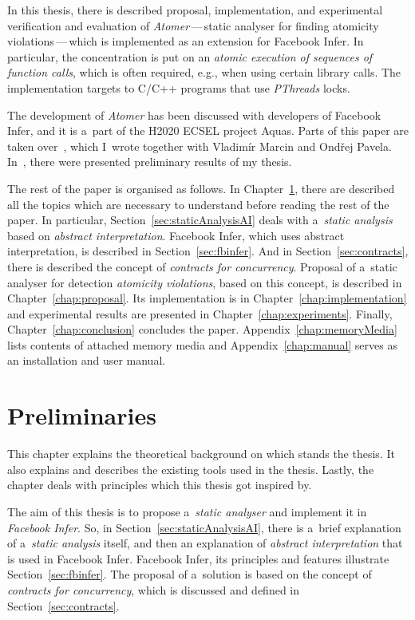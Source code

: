In this thesis, there is described proposal, implementation, and experimental
verification and evaluation of \emph{Atomer}\,---\,static analyser for
finding atomicity violations\,---\,which is implemented as an extension for
Facebook Infer. In particular, the concentration is put on an
\emph{atomic execution of sequences of function calls}, which is often
required, e.g., when using certain library calls. The implementation targets
to C/C++ programs that use \emph{PThreads} locks.

The development of \emph{Atomer} has been discussed with developers of
Facebook Infer, and it is a~part of the H2020 ECSEL project Aquas. Parts
of this paper are taken over~\cite{excel2019FBInfer}, which I~wrote
together with Vladimír Marcin and Ondřej Pavela. In~\cite{excel2019FBInfer},
there were presented preliminary results of my thesis.

The rest of the paper is organised as follows. In
Chapter~\ref{chap:preliminaries}, there are described all the topics
which are necessary to understand before reading the rest of the paper. In
particular, Section~\ref{sec:staticAnalysisAI} deals with
a~\emph{static analysis} based on \emph{abstract interpretation}.
Facebook Infer, which uses abstract interpretation, is described in
Section~\ref{sec:fbinfer}. And in Section~\ref{sec:contracts}, there is
described the concept of \emph{contracts for concurrency}. Proposal of a~static
analyser for detection \emph{atomicity violations}, based on this concept, is
described in Chapter~\ref{chap:proposal}. Its implementation is in
Chapter~\ref{chap:implementation} and experimental results are presented
in Chapter~\ref{chap:experiments}. Finally, Chapter~\ref{chap:conclusion}
concludes the paper. Appendix~\ref{chap:memoryMedia} lists contents
of attached memory media and Appendix~\ref{chap:manual} serves as an
installation and user manual.



\chapter{Preliminaries}
\label{chap:preliminaries}

This chapter explains the theoretical background on which stands the
thesis. It also explains and describes the existing tools used in the
thesis. Lastly, the chapter deals with principles which this thesis 
got inspired by.

The aim of this thesis is to propose a~\emph{static analyser} and implement
it in \emph{Facebook Infer}. So, in Section~\ref{sec:staticAnalysisAI},
there is a~brief explanation of a~\emph{static analysis} itself, and then an
explanation of \emph{abstract interpretation} that is used in Facebook Infer.
Facebook Infer, its principles and features illustrate
Section~\ref{sec:fbinfer}. The proposal of a~solution is based on the
concept of \emph{contracts for concurrency}, which is discussed and defined
in Section~\ref{sec:contracts}.


